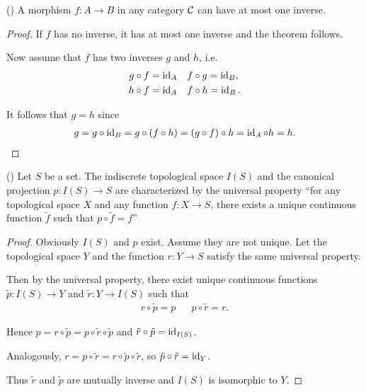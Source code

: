 \begin{proposition}\label{ex:at_most_one_isomorphism}(\cite[exercise 1.1.13]{Leinster2014})
  A morphism $f: A \to B$ in any category $\mathcal C$ can have at most one inverse.
\end{proposition}
\begin{proof}
  If $f$ has no inverse, it has at most one inverse and the theorem follows.

  Now assume that $f$ has two inverses $g$ and $h$, i.e.
  \begin{align*}
    g \circ f = \operatorname{id}_A && &f \circ g = \operatorname{id}_B,
    \\
    h \circ f = \operatorname{id}_A && &f \circ h = \operatorname{id}_B.
  \end{align*}

  It follows that $g = h$ since
  \begin{align*}
    g
    =
    g \circ \operatorname{id}_B
    =
    g \circ (f \circ h)
    =
    (g \circ f) \circ h
    =
    \operatorname{id}_A \circ h
    =
    h.
  \end{align*}
\end{proof}

\begin{example}\label{ex:indiscrete_topology_universal_property}(\cite[exercise 0.10]{Leinster2014})
  Let $S$ be a set. The indiscrete topological space $I(S)$ and the canonical projection $p: I(S) \to S$ are characterized by the universal property \enquote{for any topological space $X$ and any function $f: X \to S$, there exists a unique continuous function $\tilde f$ such that $p \circ \tilde f = f$}

  \begin{figure}[ht]
    \center
  \end{figure}
\end{example}
\begin{proof}
  Obviously $I(S)$ and $p$ exist. Assume they are not unique. Let the topological space $Y$ and the function $r: Y \to S$ satisfy the same universal property.

  Then by the universal property, there exist unique continuous functions $\tilde p: I(S) \to Y$ and $\tilde r: Y \to I(S)$ such that
  \begin{align*}
    r \circ \tilde p = p
    &&
    p \circ \tilde r = r.
  \end{align*}

  Hence $p = r \circ \tilde p = p \circ \tilde r \circ \tilde p$ and $\tilde r \circ \tilde p = \operatorname{id}_{I(S)}$.

  Analogously, $r = p \circ \tilde r = r \circ \tilde p \circ \tilde r$, so $\tilde p \circ \tilde r = \operatorname{id}_Y$.

  Thus $\tilde r$ and $\tilde p$ are mutually inverse and $I(S)$ is isomorphic to $Y$.
\end{proof}

